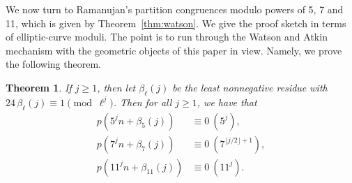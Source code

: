 \documentclass[12pt]{amsart}
\newtheorem{theorem}{Theorem}[section]
\theoremstyle{definition}
\theoremstyle{remark}
\begin{document}
We now turn to Ramanujan's partition congruences modulo powers of 5, 7 and 11, which is given by Theorem~\ref{thm:watson}.
We give the proof sketch in terms of
elliptic-curve moduli. The point is to run through the Watson and Atkin 
mechanism with the geometric objects of this paper in view. Namely, we prove the following theorem.


\begin{theorem}\label{thm:powers} If $j\geq 1$, then let
 $\beta_\ell(j)$ be the least nonnegative residue with $24\,\beta_\ell(j)\equiv1\pmod{\ell^j}$.
Then for all $j\ge1$, we have that
\begin{displaymath}
\begin{split}
p(5^{j}n+\beta_5(j))&\equiv0\ (5^{j}),\\
p(7^{j}n+\beta_7(j))&\equiv0\ (7^{\lfloor j/2\rfloor+1}),\\
p(11^{j}n+\beta_{11}(j))&\equiv0\ (11^{j}).
\end{split}
\end{displaymath}
\end{theorem}
\end{document}
